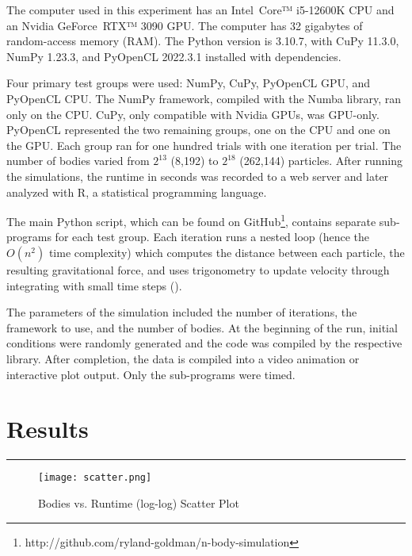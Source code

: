 \documentclass[12pt, letterpaper]{article}
\begin{document}
The computer used in this experiment has an Intel\textsuperscript 
\textregistered \ Core™ i5-12600K CPU and an Nvidia 
GeForce\textsuperscript \textregistered \  RTX™ 3090 GPU. The computer 
has 32 gigabytes of random-access memory (RAM). The Python version is 
3.10.7, with CuPy 11.3.0, NumPy 1.23.3, and PyOpenCL 2022.3.1 installed 
with dependencies.

Four primary test groups were used: NumPy, CuPy, PyOpenCL GPU, and 
PyOpenCL CPU. The NumPy framework, compiled with the Numba library, ran 
only on the CPU. CuPy, only compatible with Nvidia GPUs, was GPU-only. 
PyOpenCL represented the two remaining groups, one on the CPU and one on 
the GPU. Each group ran for one hundred trials with one iteration per 
trial. The number of bodies varied from \begin{math}2^{13}\end{math} 
(8,192) to \begin{math}2^{18}\end{math} (262,144) particles. After running 
the simulations, the runtime in seconds was recorded to a web server and 
later analyzed with R, a statistical programming language.

The main Python script, which can be found on 
GitHub\footnote[2]{http://github.com/ryland-goldman/n-body-simulation}, 
contains separate sub-programs for each test group. Each iteration runs a 
nested loop (hence the \begin{math}O(n^2)\end{math} time complexity) which 
computes the distance between each particle, the resulting gravitational 
force, and uses trigonometry to update velocity through integrating with 
small time steps (\cite{trenti_n-body_2008}).

The parameters of the simulation included the number of iterations, the 
framework to use, and the number of bodies. At the beginning of the run, 
initial conditions were randomly generated and the code was compiled by 
the respective library. After completion, the data is compiled into a 
video animation or interactive plot output. Only the sub-programs were 
timed.

\section{Results}
\vspace{1pt}\hrule\vspace{12pt}

\begin{figure}[H]
\texttt{[image: scatter.png]}
\centering
\label{fig:scatter}
\caption{Bodies vs. Runtime (log-log) Scatter Plot}
\end{figure}
\end{document}
